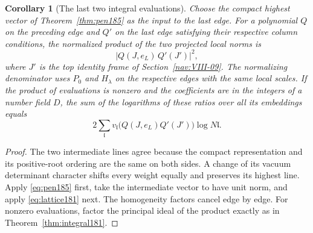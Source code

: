 \documentclass[a4paper,11pt]{article}
\newtheorem{corollary}[proposition]{Corollary}
\theoremstyle{definition}
\theoremstyle{remark}
\numberwithin{equation}{section}
\begin{document}
\begin{corollary}[The last two integral evaluations]
\label{cor:two185}
Choose the compact highest vector of Theorem~\ref{thm:pen185}
as the input to the last edge. For a polynomial \(Q\) on
the preceding edge and \(Q'\) on the last edge satisfying
their respective column conditions, the normalized product
of the two projected local norms is
\[
              |Q(J,e_L)\, Q'(J')|^2 ,
\]
where \(J'\) is the top identity frame of Section~\ref{nav:VIII-09}. The
normalizing denominator uses \(P_0\) and \(H_\lambda\) on
the respective edges with the same local scales. If the
product of evaluations is nonzero and the coefficients
are in the integers of a number field \(D\), the sum of
the logarithms of these ratios over all its embeddings
equals
\[
       2\sum_{\mathfrak l}
          v_{\mathfrak l}\big(Q(J,e_L)Q'(J')\big)\log N\mathfrak l .
\]
\end{corollary}
\begin{proof}
The two intermediate lines agree because the compact
representation and its positive-root ordering are the
same on both sides. A change of its vacuum determinant
character shifts every weight equally and preserves its
highest line. Apply \eqref{eq:pen185} first, take the
intermediate vector to have unit norm, and apply
\eqref{eq:lattice181} next. The homogeneity factors cancel
edge by edge. For nonzero evaluations, factor the principal
ideal of the product exactly as in
Theorem~\ref{thm:integral181}.
\end{proof}
\end{document}
